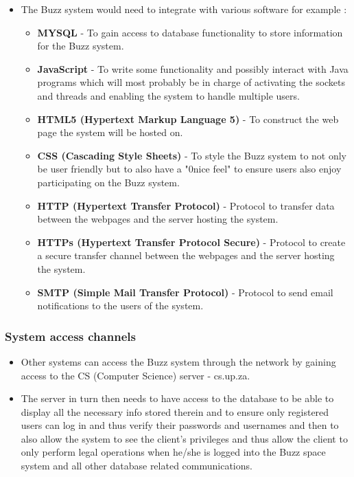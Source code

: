 \documentclass[a4paper]{article}
\begin{document}
\begin{itemize}
\item The Buzz system would need to integrate with various software for example :
\begin{itemize}
\item \textbf{MYSQL} - To gain access to database functionality to store information for the Buzz system.
\item \textbf{JavaScript} - To write some functionality and possibly interact with Java programs which will most probably be in charge of activating the sockets and threads and enabling the system to handle multiple users.
\item\textbf{ HTML5 (Hypertext Markup Language 5)} - To construct the web page the system will be hosted on.
\item \textbf{CSS (Cascading Style Sheets)} - To style the Buzz system to not only be user friendly but to also have a "0nice feel" to ensure users also enjoy participating on the Buzz system.
\item \textbf{HTTP (Hypertext Transfer Protocol)} - Protocol to transfer data between the webpages and the server hosting the system.
\item \textbf{HTTPs (Hypertext Transfer Protocol Secure)} - Protocol to create a secure transfer channel between the webpages and the server hosting the system.
\item \textbf{SMTP (Simple Mail Transfer Protocol)} - Protocol to send email notifications to the users of the system. 
\end{itemize}
\end{itemize}

\subsubsection{System access channels }

\begin{itemize}
\item Other systems can access the Buzz system through the network by gaining access to the  CS (Computer Science) server - cs.up.za. 
\item The server in turn then needs to have access to the database to be able to display all the necessary info stored therein and to ensure only registered users can log in and thus verify their passwords and usernames and then to also allow the system to see the client's privileges and thus allow the client to only perform legal operations when he/she is logged into the Buzz space system and all other database related communications. 
\end{itemize}
\end{document}

